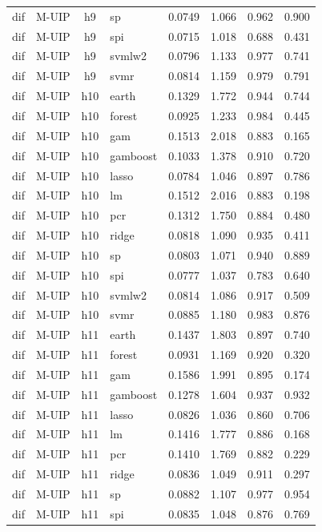 \begin{ThreePartTable}
\begin{longtable}[t]{llclcccc}
dif & M-UIP & h9 & sp & 0.0749 & 1.066 & 0.962 & 0.900\\
dif & M-UIP & h9 & spi & 0.0715 & 1.018 & 0.688 & 0.431\\
dif & M-UIP & h9 & svmlw2 & 0.0796 & 1.133 & 0.977 & 0.741\\
dif & M-UIP & h9 & svmr & 0.0814 & 1.159 & 0.979 & 0.791\\
\addlinespace
dif & M-UIP & h10 & earth & 0.1329 & 1.772 & 0.944 & 0.744\\
dif & M-UIP & h10 & forest & 0.0925 & 1.233 & 0.984 & 0.445\\
dif & M-UIP & h10 & gam & 0.1513 & 2.018 & 0.883 & 0.165\\
dif & M-UIP & h10 & gamboost & 0.1033 & 1.378 & 0.910 & 0.720\\
dif & M-UIP & h10 & lasso & 0.0784 & 1.046 & 0.897 & 0.786\\
dif & M-UIP & h10 & lm & 0.1512 & 2.016 & 0.883 & 0.198\\
dif & M-UIP & h10 & pcr & 0.1312 & 1.750 & 0.884 & 0.480\\
dif & M-UIP & h10 & ridge & 0.0818 & 1.090 & 0.935 & 0.411\\
dif & M-UIP & h10 & sp & 0.0803 & 1.071 & 0.940 & 0.889\\
dif & M-UIP & h10 & spi & 0.0777 & 1.037 & 0.783 & 0.640\\
dif & M-UIP & h10 & svmlw2 & 0.0814 & 1.086 & 0.917 & 0.509\\
dif & M-UIP & h10 & svmr & 0.0885 & 1.180 & 0.983 & 0.876\\
\addlinespace
dif & M-UIP & h11 & earth & 0.1437 & 1.803 & 0.897 & 0.740\\
dif & M-UIP & h11 & forest & 0.0931 & 1.169 & 0.920 & 0.320\\
dif & M-UIP & h11 & gam & 0.1586 & 1.991 & 0.895 & 0.174\\
dif & M-UIP & h11 & gamboost & 0.1278 & 1.604 & 0.937 & 0.932\\
dif & M-UIP & h11 & lasso & 0.0826 & 1.036 & 0.860 & 0.706\\
dif & M-UIP & h11 & lm & 0.1416 & 1.777 & 0.886 & 0.168\\
dif & M-UIP & h11 & pcr & 0.1410 & 1.769 & 0.882 & 0.229\\
dif & M-UIP & h11 & ridge & 0.0836 & 1.049 & 0.911 & 0.297\\
dif & M-UIP & h11 & sp & 0.0882 & 1.107 & 0.977 & 0.954\\
dif & M-UIP & h11 & spi & 0.0835 & 1.048 & 0.876 & 0.769\\

\end{longtable}
\end{ThreePartTable}
